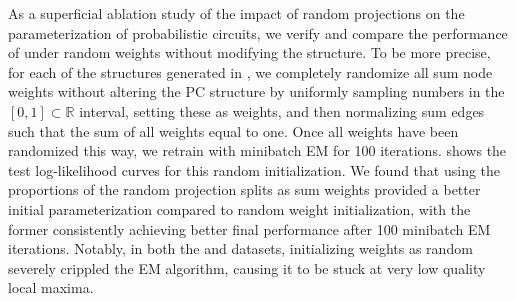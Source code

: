 As a superficial ablation study of the impact of random projections on the parameterization of
probabilistic circuits, we verify and compare the performance of  under random
weights without modifying the structure. To be more precise, for each of the structures generated
in , we completely randomize all sum node weights without altering the PC
structure by uniformly sampling numbers in the $\left[0,1\right]\subset\mathbb{R}$ interval,
setting these as weights, and then normalizing sum edges such that the sum of all weights equal to
one. Once all weights have been randomized this way, we retrain with minibatch EM for 100
iterations.  shows the test log-likelihood curves for this random
initialization. We found that using the proportions of the random projection splits as sum weights
provided a better initial parameterization compared to random weight initialization, with the
former consistently achieving better final performance after 100 minibatch EM iterations. Notably,
in both the  and  datasets, initializing weights as random severely
crippled the EM algorithm, causing it to be stuck at very low quality local maxima.

